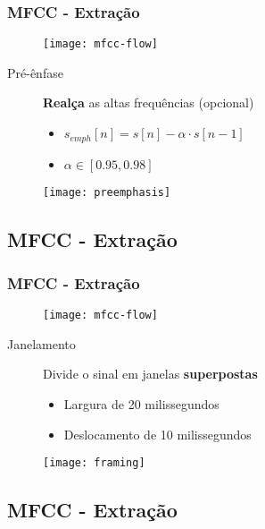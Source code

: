 \begin{frame}
\frametitle{MFCC - Extração}
\begin{figure}[ht]
    \centering
    \texttt{[image: mfcc-flow]}
\end{figure}
\pause

\begin{description}
    \item[Pré-ênfase] \textbf{Realça} as altas frequências (opcional)
    \pause
    \begin{itemize}
        \item $s_{emph}[n] = s[n] - \alpha \cdot s[n - 1]$
        \pause
        \item $\alpha \in [0.95, 0.98]$
        \pause
    \end{itemize}
\end{description}
\begin{figure}[ht]
    \centering
    \texttt{[image: preemphasis]}
\end{figure}
\end{frame}

\subsection{MFCC - Extração}

\begin{frame}
\frametitle{MFCC - Extração}
\begin{figure}[ht]
    \centering
    \texttt{[image: mfcc-flow]}
\end{figure}
\pause

\begin{description}
    \item[Janelamento] Divide o sinal em janelas \textbf{superpostas}
    \pause
    \begin{itemize}
        \item Largura de 20 milissegundos
        \pause
        \item Deslocamento de 10 milissegundos
        \pause
    \end{itemize}
\end{description}
\begin{figure}[ht]
    \centering
    \texttt{[image: framing]}
\end{figure}
\end{frame}

\subsection{MFCC - Extração}

